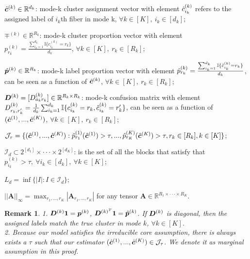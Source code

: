 \documentclass{article}
\newtheorem{remark}{Remark}
\begin{document}
\begin{appendices}
$\hat{\boldsymbol{c}}^{(k)}\in \mathbb{R}^{d_k}$: mode-k cluster assignment vector with element $\hat{c}^{(k)}_{i_k}$ refers to the assigned label of $i_k$th fiber in mode k, $\forall k\in[K],~i_k\in[d_k]$;

$\mp^{(k)}\in \mathbb{R}^{R_k}$: mode-k cluster proportion vector with element $p_{r_k}^{(k)}=\frac{\sum_{i_k=1}^{d_k}\mathbb{I}\{c_{i_k}^{(k)}=r_k\}}{d_k}$, $\forall k\in[K],~r_k\in[R_k]$;

$\hat{\boldsymbol{p}}^{(k)}\in \mathbb{R}^{R_k}$: mode-k label proportion vector with element $\hat{p}_{r_k}^{(k)}=\frac{\sum_{i_k=1}^{d_k}\mathbb{I}\{\hat{c}_{i_k}^{(k)}=r_k\}}{d_k}$,  can be seen as a function of $\hat{\boldsymbol{c}}^{(k)}$,  $\forall k\in[K],~r_k\in[R_k]$;

$\boldsymbol{D}^{(k)} = [D^{(k)}_{a_kr_k}]\in\mathbb{R}^{R_k\times R_k}$: mode-k confusion matrix with element $D_{r_k,r_k'}^{(k)}=\frac{1}{d_k}\sum_{i_k=1}^{d_k}\mathbb{I}\{c_{i_k}^{(k)}=r_k,\hat{c}_{i_k}^{(k)}=r_k'\}$, can be seen as a function of $(\hat{\boldsymbol{c}}^{(1)},...,\hat{\boldsymbol{c}}^{(K)})$, $\forall k\in[K],~r_k\in[R_k]$;

$\mathcal{J}_{\tau}=\{(\hat{\boldsymbol{c}}^{(1)},...,\hat{\boldsymbol{c}}^{(K)}): \hat{p}^{(1)}_{r_1}(\hat{\boldsymbol{c}}^{(1)})>\tau,...,\hat{p}^{(K)}_{r_K}(\hat{\boldsymbol{c}}^{(K)})>\tau, r_k\in[R_k], k\in[K]\}$;

$\mathcal{I}_d\subset 2^{[d_1]}\times \cdot\cdot\cdot \times 2^{[d_K]}$: is the set of all the blocks that satisfy that $p^{(k)}_{i_k}>\tau,~\forall i_k\in[d_k],~\forall k\in[K]$;

$L_d=\inf\{|I|:I\in\mathcal{I}_d\}$;


$||\boldsymbol{A}||_\infty=\max_{r_1,...,r_K}|\boldsymbol{A}_{r_1,...,r_K}|$ for any tensor $\boldsymbol{A}\in\mathbb{R}^{R_1\times\cdot\cdot\cdot\times R_K}$.

\begin{remark}
1. $\boldsymbol{D}^{(k)}\boldsymbol{1}=\boldsymbol{p}^{(k)}$, $\boldsymbol{D}^{(k)^T}\boldsymbol{1}=\hat{\boldsymbol{p}}^{(k)}$. If $\boldsymbol{D}^{(k)}$ is diagonal, then the assigned labels match the true cluster in mode $k$, $\forall k\in[K]$. \\
2. Because our model satisfies the irreducible core assumption, there is always exists a $\tau$ such that our estimator $(\hat{\boldsymbol{c}}^{(1)},...,\hat{\boldsymbol{c}}^{(K)})\in \mathcal{J}_\tau$. We denote it as marginal assumption in this proof.
\end{remark}




\end{appendices}
\end{document}
